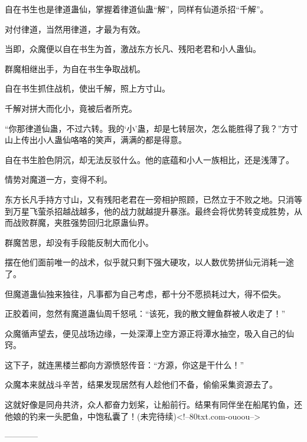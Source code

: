 \begin{this_body}
自在书生也是律道蛊仙，掌握着律道仙蛊“解”，同样有仙道杀招“千解”。

对付律道，当然用律道，才最为有效。

当即，众魔便以自在书生为首，激战东方长凡、残阳老君和小人蛊仙。

群魔相继出手，为自在书生争取战机。

自在书生抓住战机，使出千解，照上方寸山。

千解对拼大而化小，竟被后者所克。

“你那律道仙蛊，不过六转。我的‘小’蛊，却是七转层次，怎么能胜得了我？”方寸山上传出小人蛊仙咯咯的笑声，满满的都是得意。

自在书生脸色阴沉，却无法反驳什么。他的底蕴和小人一族相比，还是浅薄了。

情势对魔道一方，变得不利。

东方长凡手持方寸山，又有残阳老君在一旁相护照顾，已然立于不败之地。只消等到万星飞萤杀招越战越多，他的战力就越提升暴涨。最终会将优势转变成胜势，从而战败群魔，夹胜强势回归北原蛊仙界。

群魔苦思，却没有手段能反制大而化小。

摆在他们面前唯一的战术，似乎就只剩下强大硬攻，以人数优势拼仙元消耗一途了。

但魔道蛊仙独来独往，凡事都为自己考虑，都十分不愿损耗过大，得不偿失。

正胶着间，忽然有魔道蛊仙周千怒吼：“该死，我的散文鲤鱼群被人收走了！”

众魔循声望去，便见战场边缘，一处深潭上空方源正将潭水抽空，吸入自己的仙窍。

这下子，就连黑楼兰都向方源愤怒传音：“方源，你这是干什么！”

众魔本来就战斗辛苦，结果发现居然有人趁他们不备，偷偷采集资源去了。

这就好像是同舟共济，众人都奋力划桨，让船前行。结果有同伴坐在船尾钓鱼，还他娘的钓来一头肥鱼，中饱私囊了！(未完待续)<!--80txt.com-ouoou-->

------------

\end{this_body}

